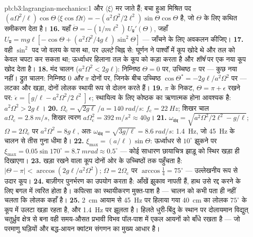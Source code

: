 \begin{solution}{pb:b3:lagrangian-mechanics:1}
और $\langle\xi\rangle$ मर जाते हैं; बचा हुआ मिश्रित पद
$(a\Omega^2/\ell)\cos\Theta\,\langle\xi\cos\Omega t\rangle =
-(a^2\Omega^2/2\ell^2)\sin\Theta\cos\Theta$ है, जो $\Theta$ के लिए
कथित समीकरण देता है।
\textbf{16.} यहाँ $\ddot\Theta = -(1/m\ell^2)\,U_{\text{प्र}}'(\Theta)$, जहाँ
$U_{\text{प्र}} = mg\ell[-\cos\Theta + (a^2\Omega^2/4g\ell)
\sin^2\Theta]$ --- जाँचने के लिए अवकलन कीजिए।
\textbf{17.} वही $\sin^2$ पद जो वलय के पास था, पर
\emph{उलटे} चिह्न से: घूर्णन ने पार्श्वों में कूप खोदे थे और तल को
केवल चपटा कर सकता था; ऊर्ध्वाधर हिलाना तल के कूप को कड़ा करता है और
\emph{शीर्ष} पर एक नया कूप खोद देता है।
\textbf{18.} मंद चालन ($a^2\Omega^2 < 2g\ell$): निम्निष्ठ $\Theta =
0$ पर, उच्चिष्ठ $\pi$ पर --- कुछ नया नहीं। द्रुत चालन: निम्निष्ठ $0$
\emph{और} $\pi$ दोनों पर, जिनके बीच उच्चिष्ठ $\cos\Theta^* =
-2g\ell/a^2\Omega^2$ पर --- लटका और खड़ा, दोनों लोलक स्थायी रूप से
दोलन करते हैं।
\textbf{19.} $\pi$ के निकट, $\Theta = \pi + \epsilon$ रखने पर:
$\ddot\epsilon = [g/\ell - a^2\Omega^2/2\ell^2]\,\epsilon$; स्थायित्व
के लिए कोष्ठक का ऋणात्मक होना आवश्यक है: $a^2\Omega^2 > 2g\ell$।
\textbf{20.} $\Omega_{\text{c}} = \sqrt{2g\ell}/a = \qty{140}{rad/s}$:
$f_{\text{c}} = \qty{22}{Hz}$; शिखर चाल $a\Omega_{\text{c}} =
\qty{2.8}{m/s}$, शिखर त्वरण $a\Omega_{\text{c}}^2 =
\qty{392}{m/s^2} \approx 40g$।
\textbf{21.} $\omega_{\text{मंद}} = \sqrt{a^2\Omega^2/2\ell^2 -
g/\ell}$; $\Omega = 2\Omega_{\text{c}}$ पर $a^2\Omega^2 = 8g\ell$, अतः
$\omega_{\text{मंद}} = \sqrt{3g/\ell} = \qty{8.6}{rad/s}$:
\qty{1.4}{Hz}, जो \qty{45}{Hz} के चालन से तीस गुना धीमा है।
\textbf{22.} $\xi_{\max} = (a/\ell)\sin\Theta$: ऊर्ध्वाधर से
$10^\circ$ झुकने पर $\xi_{\max} = 0.05\sin170^\circ = \qty{8.7}{mrad}
\approx 0.5^\circ$ --- कोई साधारण छायाचित्र झाड़ू को स्थिर खड़ा ही
दिखाएगा।
\textbf{23.} खड़ा रखने वाला कूप दोनों ओर के उच्चिष्ठों तक पहुँचता है:
$|\Theta - \pi| < \arccos(2g\ell/a^2\Omega^2)$; $\Omega =
2\Omega_{\text{c}}$ पर $\arccos\tfrac14 = 75^\circ$ --- उल्लेखनीय रूप
से उदार कूप।
\textbf{24.} बाज़ीगर पुनर्भरण का उपयोग करता है: आँखें झुकाव नापती हैं,
हाथ उसे रद्द करने के लिए बगल में त्वरित होता है। कपित्सा का स्थायीकरण
मुक्त-पाश है --- चालन को कभी पता ही नहीं चलता कि लोलक कहाँ है।
\textbf{25.} \qty{2}{cm} आयाम से \qty{45}{Hz} पर हिलाया गया
\qty{40}{cm} का लोलक $75^\circ$ के कूप में उलटा खड़ा रहता है, और
\qty{1.4}{Hz} पर झूलता है। हिलते धुरी-बिंदु के स्थान पर दोलायमान
विद्युत् चतुर्ध्रुव क्षेत्र से बना वही समय-औसत प्रभावी विभव पॉल-पाश में
एकल आयनों को बाँधे रखता है --- जो परमाणु घड़ियों और बद्ध-आयन क्वांटम
संगणन का मुख्य आधार है।
\end{solution}
